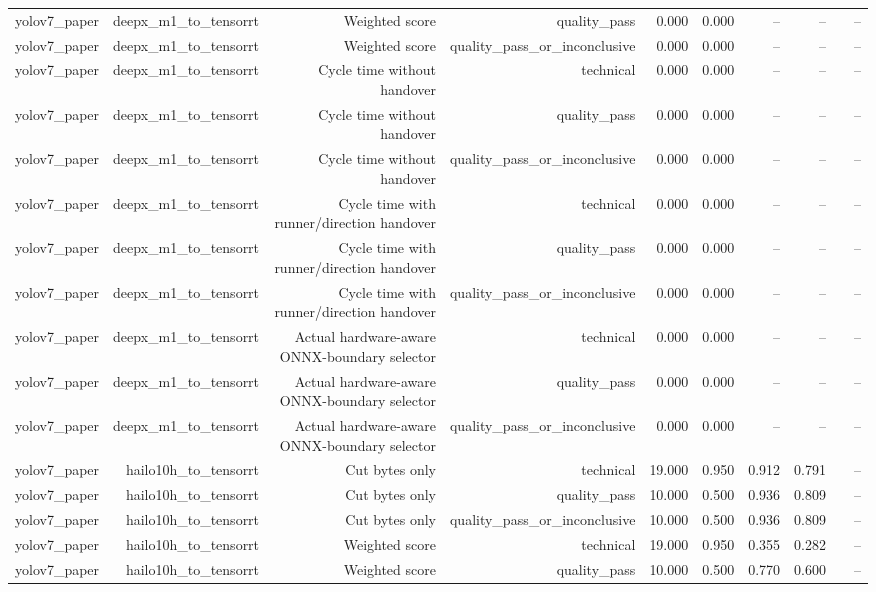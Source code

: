 \begin{table}[t]
\begin{tabular}{lrrrrrrrrr}
yolov7\_paper & deepx\_m1\_to\_tensorrt & Weighted score & quality\_pass & 0.000 & 0.000 & -- & -- &  & -- \\
yolov7\_paper & deepx\_m1\_to\_tensorrt & Weighted score & quality\_pass\_or\_inconclusive & 0.000 & 0.000 & -- & -- &  & -- \\
yolov7\_paper & deepx\_m1\_to\_tensorrt & Cycle time without handover & technical & 0.000 & 0.000 & -- & -- &  & -- \\
yolov7\_paper & deepx\_m1\_to\_tensorrt & Cycle time without handover & quality\_pass & 0.000 & 0.000 & -- & -- &  & -- \\
yolov7\_paper & deepx\_m1\_to\_tensorrt & Cycle time without handover & quality\_pass\_or\_inconclusive & 0.000 & 0.000 & -- & -- &  & -- \\
yolov7\_paper & deepx\_m1\_to\_tensorrt & Cycle time with runner/direction handover & technical & 0.000 & 0.000 & -- & -- &  & -- \\
yolov7\_paper & deepx\_m1\_to\_tensorrt & Cycle time with runner/direction handover & quality\_pass & 0.000 & 0.000 & -- & -- &  & -- \\
yolov7\_paper & deepx\_m1\_to\_tensorrt & Cycle time with runner/direction handover & quality\_pass\_or\_inconclusive & 0.000 & 0.000 & -- & -- &  & -- \\
yolov7\_paper & deepx\_m1\_to\_tensorrt & Actual hardware-aware ONNX-boundary selector & technical & 0.000 & 0.000 & -- & -- &  & -- \\
yolov7\_paper & deepx\_m1\_to\_tensorrt & Actual hardware-aware ONNX-boundary selector & quality\_pass & 0.000 & 0.000 & -- & -- &  & -- \\
yolov7\_paper & deepx\_m1\_to\_tensorrt & Actual hardware-aware ONNX-boundary selector & quality\_pass\_or\_inconclusive & 0.000 & 0.000 & -- & -- &  & -- \\
yolov7\_paper & hailo10h\_to\_tensorrt & Cut bytes only & technical & 19.000 & 0.950 & 0.912 & 0.791 &  & -- \\
yolov7\_paper & hailo10h\_to\_tensorrt & Cut bytes only & quality\_pass & 10.000 & 0.500 & 0.936 & 0.809 &  & -- \\
yolov7\_paper & hailo10h\_to\_tensorrt & Cut bytes only & quality\_pass\_or\_inconclusive & 10.000 & 0.500 & 0.936 & 0.809 &  & -- \\
yolov7\_paper & hailo10h\_to\_tensorrt & Weighted score & technical & 19.000 & 0.950 & 0.355 & 0.282 &  & -- \\
yolov7\_paper & hailo10h\_to\_tensorrt & Weighted score & quality\_pass & 10.000 & 0.500 & 0.770 & 0.600 &  & -- \\

\end{tabular}
\end{table}
